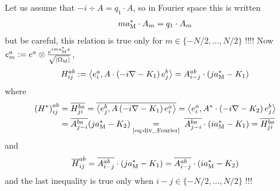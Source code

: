 \documentclass[11pt,a4paper,reqno,french,tikz]{amsart}
\newcommand{\pa}[1]{\left( #1 \right)} %
\newcommand{\ab}[1]{\left|#1\right|} %
\newcommand{\ps}[1]{\left< #1 \right>} %
\newcommand{\na}{\nabla} %
\newcommand{\f}[2]{\frac{#1}{#2}} %
\newcommand{\ind}[1]{_{\textup{#1}}} %
\newcommand{\sqom}{\sqrt{\ab{\Omega\ind{M}}}}
\begin{document}
Let us assume that $-i\div A = q_1 \cdot A$, so in Fourier space this is written
\begin{align}\label{eq:div_Fourier}
	m a\ind{M}^* \cdot A_m = q_1 \cdot A_m
\end{align}
but be careful, this relation is true only for $m \in \{-N/2,\dots,N/2\}$ !!!! Now $e_m^a := e^a \otimes \f{e^{i m a\ind{M}^* x}}{\sqom}$,
\begin{align*}
H_{ij}^{ab} := \ps{e_i^a, A \cdot \pa{-i\na -  K_1} e^b_j} = A_{i-j}^{ab} \cdot (j a\ind{M}^* - K_1)
\end{align*}
where
\begin{align*}
	\pa{H^*}^{ab}_{ij} &= \overline{H^{ba}_{ji}} = \overline{\ps{e^b_j, A\pa{-i\na - K_1} e^a_i}} =\ps{e_i^a, A^* \cdot \pa{-i\na -K_2}e^b_j} \\
&= \overline{A^{ba}_{j-i}}(j a\ind{M}^* -K_2) \underset{\substack{\refeq{eq:div_Fourier}}}{=} \; \overline{A^{ba}_{j-i}} \cdot \pa{i a\ind{M}^* - K_1} = \overline{H^{ba}_{ji}}
\end{align*}
and
\begin{align*}
\overline{H}^{ab}_{ij} = \overline{A_{i-j}^{ab}} \cdot (j a\ind{M}^* - K_1) = \overline{A_{i-j}^{ab}} \cdot (i a\ind{M}^* -K_2)
\end{align*}
and the last inequality is true only when $i-j \in \{-N/2,\dots,N/2\}$ !!!








\end{document}
